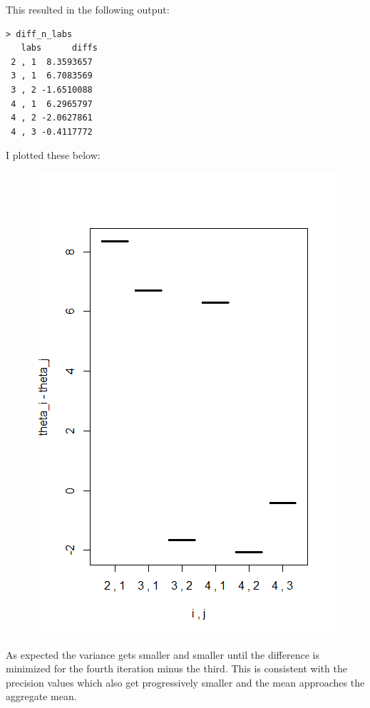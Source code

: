 \documentclass[12pt]{article}
\begin{document}
This resulted in the following output:
\begin{verbatim}
> diff_n_labs
   labs      diffs
 2 , 1  8.3593657
 3 , 1  6.7083569
 3 , 2 -1.6510088
 4 , 1  6.2965797
 4 , 2 -2.0627861
 4 , 3 -0.4117772
\end{verbatim}
I plotted these below:
\begin{figure}[H]
\begin{flushleft}
\includegraphics[scale=.9]{q3.png}
\end{flushleft}
\end{figure}
As expected the variance gets smaller and smaller until the difference is minimized for the fourth iteration minus the third.  This is consistent with the precision values which also get progressively smaller and the mean approaches the aggregate mean.
\end{document}
